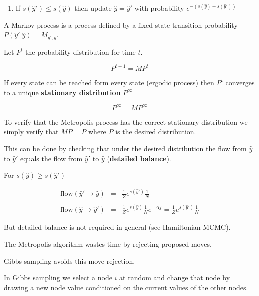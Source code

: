 {\begin{enumerate}
  \vfill
\item If $s(\hat{y}') \leq s(\hat{y})$ then update $\hat{y} = \hat{y}'$ with probability $e^{-(s(\hat{y}) - s(\hat{y}'))}$
  \end{enumerate}  


A Markov process is a process defined by a fixed state transition probability $P(\hat{y}'|\hat{y}) = M_{\hat{y}',\hat{y}}$.

\vfill
Let $P^t$ the probability distribution for time $t$.

\vfill
$$P^{t+1} = MP^t$$

\vfill
If every state can be reached form every state (ergodic process) then $P^t$ converges to a unique {\bf stationary distribution} $P^\infty$

\vfill
$$P^\infty = MP^\infty$$


To verify that the Metropolis process has the correct stationary distribution we simply verify that $MP = P$ where $P$
is the desired distribution.

\vfill
This can be done by checking that under the desired distribution the flow from $\hat{y}$ to $\hat{y}'$
equals the flow from $\hat{y}'$ to $\hat{y}$ ({\bf detailed balance}).


For $s(\hat{y}) \geq s(\hat{y}')$

\vfill
\begin{eqnarray*}
  \mathrm{flow}(\hat{y}' \rightarrow \hat{y}) &  = & \frac{1}{Z}e^{s(\hat{y}')} \frac{1}{N} \\
  \\
\mathrm{flow}(\hat{y} \rightarrow \hat{y}') & = & \frac{1}{Z}e^{s(\hat{y})} \frac{1}{N} e^{-\Delta f} = \frac{1}{Z} e^{s(\hat{y}')} \frac{1}{N}
\end{eqnarray*}

\vfill
But detailed balance is not required in general (see Hamiltonian MCMC).


The Metropolis algorithm wastes time by rejecting proposed moves.

\vfill
Gibbs sampling avoids this move rejection.

\vfill
In Gibbs sampling we select a node $i$ at random and change that node by drawing a new node value conditioned on the current values of the other nodes.

}
